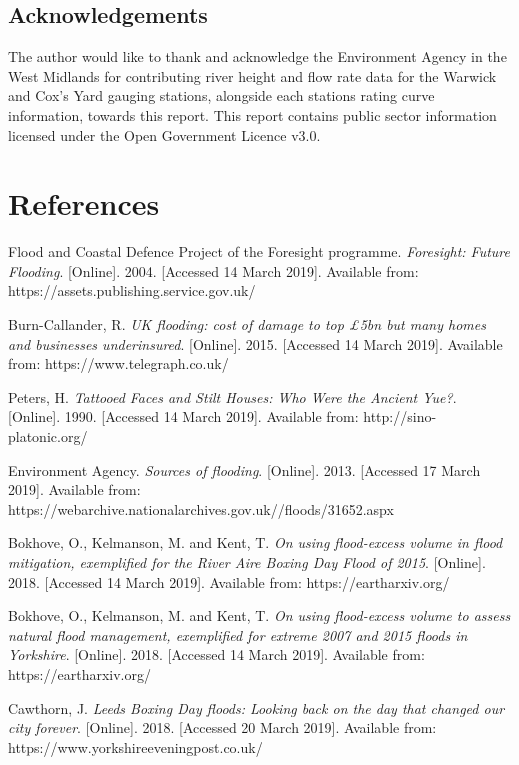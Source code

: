 \documentclass[11pt,a4paper]{article}
\begin{document}
\subsection{Acknowledgements}
The author would like to thank and acknowledge the Environment Agency in the West Midlands for contributing river height and flow rate data for the Warwick and Cox's Yard gauging stations, alongside each stations rating curve information, towards this report. This report contains public sector information licensed under the Open Government Licence v3.0.

\section{References}
\begin{thebibliography}{}
Flood and Coastal Defence Project of the Foresight programme. \textit{Foresight: Future Flooding}. [Online]. 2004. [Accessed 14 March 2019]. Available from: https://assets.publishing.service.gov.uk/

Burn-Callander, R. \textit{UK flooding: cost of damage to top £5bn but many homes and businesses underinsured}. [Online]. 2015. [Accessed 14 March 2019]. Available from: https://www.telegraph.co.uk/

Peters, H. \textit{Tattooed Faces and Stilt Houses: Who Were the Ancient Yue?}. [Online]. 1990. [Accessed 14 March 2019]. Available from: http://sino-platonic.org/

Environment Agency. \textit{Sources of flooding}. [Online]. 2013. [Accessed 17 March 2019]. Available from: https://webarchive.nationalarchives.gov.uk//floods/31652.aspx

Bokhove, O., Kelmanson, M. and Kent, T. \textit{On using flood-excess volume in flood mitigation, exemplified for the River Aire Boxing Day Flood of 2015}. [Online]. 2018. [Accessed 14 March 2019]. Available from: https://eartharxiv.org/

Bokhove, O., Kelmanson, M. and Kent, T. \textit{On using flood-excess volume to assess natural flood management, exemplified for extreme 2007 and 2015 floods in Yorkshire}. [Online]. 2018. [Accessed 14 March 2019]. Available from: https://eartharxiv.org/

Cawthorn, J. \textit{Leeds Boxing Day floods: Looking back on the day that changed our city forever}. [Online]. 2018. [Accessed 20 March 2019]. Available from: https://www.yorkshireeveningpost.co.uk/


\end{thebibliography}
\end{document}
